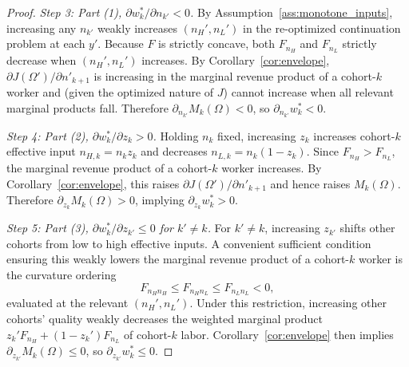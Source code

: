 \begin{proof}
\medskip
\noindent\textit{Step 3: Part (1), $\partial w_k^*/\partial n_{k'}<0$.}
By Assumption~\ref{ass:monotone_inputs}, increasing any $n_{k'}$ weakly increases $(n_H',n_L')$ in the re-optimized continuation
problem at each $y'$. Because $F$ is strictly concave, both $F_{n_H}$ and $F_{n_L}$ strictly decrease when $(n_H',n_L')$ increases.
By Corollary~\ref{cor:envelope}, $\partial J(\Omega')/\partial n'_{k+1}$ is increasing in the marginal revenue product of a cohort-$k$
worker and (given the optimized nature of $J$) cannot increase when all relevant marginal products fall.
Therefore $\partial_{n_{k'}} M_k(\Omega)<0$, so $\partial_{n_{k'}}w_k^*<0$.

\medskip
\noindent\textit{Step 4: Part (2), $\partial w_k^*/\partial z_k>0$.}
Holding $n_k$ fixed, increasing $z_k$ increases cohort-$k$ effective input $n_{H,k}=n_k z_k$ and decreases $n_{L,k}=n_k(1-z_k)$.
Since $F_{n_H}>F_{n_L}$, the marginal revenue product of a cohort-$k$ worker increases. By Corollary~\ref{cor:envelope},
this raises $\partial J(\Omega')/\partial n'_{k+1}$ and hence raises $M_k(\Omega)$.
Therefore $\partial_{z_k}M_k(\Omega)>0$, implying $\partial_{z_k}w_k^*>0$.

\medskip
\noindent\textit{Step 5: Part (3), $\partial w_k^*/\partial z_{k'}\le 0$ for $k'\neq k$.}
For $k'\neq k$, increasing $z_{k'}$ shifts other cohorts from low to high effective inputs.
A convenient sufficient condition ensuring this weakly lowers the marginal revenue product of a cohort-$k$ worker is the curvature
ordering
\[
F_{n_H n_H}\le F_{n_H n_L}\le F_{n_L n_L}<0,
\]
evaluated at the relevant $(n_H',n_L')$. Under this restriction, increasing other cohorts' quality weakly decreases the weighted
marginal product $z_k'F_{n_H}+(1-z_k')F_{n_L}$ of cohort-$k$ labor. Corollary~\ref{cor:envelope} then implies
$\partial_{z_{k'}}M_k(\Omega)\le 0$, so $\partial_{z_{k'}}w_k^*\le 0$.
\end{proof}


